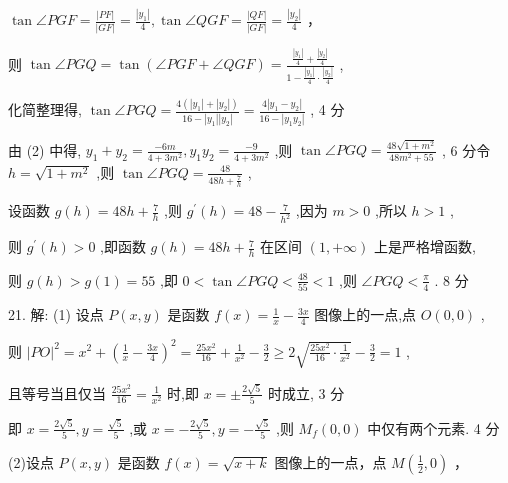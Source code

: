 \documentclass[10pt]{article}
\begin{document}
\(\tan \angle {PGF} = \frac{\left| PF\right| }{\left| GF\right| } = \frac{\left| {y}_{1}\right| }{4},\tan \angle {QGF} = \frac{\left| QF\right| }{\left| GF\right| } = \frac{\left| {y}_{2}\right| }{4}\) ，

则 \(\tan \angle {PGQ} = \tan \left( {\angle {PGF} + \angle {QGF}}\right)  = \frac{\frac{\left| {y}_{1}\right| }{4} + \frac{\left| {y}_{2}\right| }{4}}{1 - \frac{\left| {y}_{1}\right| }{4} \cdot  \frac{\left| {y}_{2}\right| }{4}}\) ,

化简整理得, \(\tan \angle {PGQ} = \frac{4\left( {\left| {y}_{1}\right|  + \left| {y}_{2}\right| }\right) }{{16} - \left| {y}_{1}\right| \left| {y}_{2}\right| } = \frac{4\left| {{y}_{1} - {y}_{2}}\right| }{{16} - \left| {{y}_{1}{y}_{2}}\right| }\) , 4 分

由 (2) 中得, \({y}_{1} + {y}_{2} = \frac{-{6m}}{4 + 3{m}^{2}},{y}_{1}{y}_{2} = \frac{-9}{4 + 3{m}^{2}}\) ,则 \(\tan \angle {PGQ} = \frac{{48}\sqrt{1 + {m}^{2}}}{{48}{m}^{2} + {55}}\) , 6 分令 \(h = \sqrt{1 + {m}^{2}}\) ,则 \(\tan \angle {PGQ} = \frac{48}{{48h} + \frac{7}{h}}\) ,

设函数 \(g\left( h\right)  = {48h} + \frac{7}{h}\) ,则 \({g}^{\prime }\left( h\right)  = {48} - \frac{7}{{h}^{2}}\) ,因为 \(m > 0\) ,所以 \(h > 1\) ,

则 \({g}^{\prime }\left( h\right)  > 0\) ,即函数 \(g\left( h\right)  = {48h} + \frac{7}{h}\) 在区间 \(\left( {1, + \infty }\right)\) 上是严格增函数,

则 \(g\left( h\right)  > g\left( 1\right)  = {55}\) ,即 \(0 < \tan \angle {PGQ} < \frac{48}{55} < 1\) ,则 \(\angle {PGQ} < \frac{\pi }{4}\) . 8 分

21. 解: (1) 设点 \(P\left( {x,y}\right)\) 是函数 \(f\left( x\right)  = \frac{1}{x} - \frac{3x}{4}\) 图像上的一点,点 \(O\left( {0,0}\right)\) ,

则 \({\left| PO\right| }^{2} = {x}^{2} + {\left( \frac{1}{x} - \frac{3x}{4}\right) }^{2} = \frac{{25}{x}^{2}}{16} + \frac{1}{{x}^{2}} - \frac{3}{2} \geq  2\sqrt{\frac{{25}{x}^{2}}{16} \cdot  \frac{1}{{x}^{2}}} - \frac{3}{2} = 1\) ,

且等号当且仅当 \(\frac{{25}{x}^{2}}{16} = \frac{1}{{x}^{2}}\) 时,即 \(x =  \pm  \frac{2\sqrt{5}}{5}\) 时成立, 3 分

即 \(x = \frac{2\sqrt{5}}{5},y = \frac{\sqrt{5}}{5}\) ,或 \(x =  - \frac{2\sqrt{5}}{5},y =  - \frac{\sqrt{5}}{5}\) ,则 \({M}_{f}\left( {0,0}\right)\) 中仅有两个元素. 4 分

(2)设点 \(P\left( {x,y}\right)\) 是函数 \(f\left( x\right)  = \sqrt{x + k}\) 图像上的一点，点 \(M\left( {\frac{1}{2},0}\right)\) ，
\end{document}
